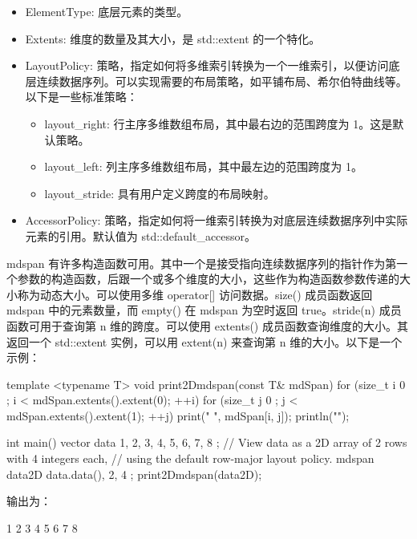 \begin{itemize}
\item
ElementType: 底层元素的类型。

\item
Extents: 维度的数量及其大小，是 std::extent 的一个特化。

\item
LayoutPolicy: 策略，指定如何将多维索引转换为一个一维索引，以便访问底层连续数据序列。可以实现需要的布局策略，如平铺布局、希尔伯特曲线等。以下是一些标准策略：
\begin{itemize}
\item
layout\_right: 行主序多维数组布局，其中最右边的范围跨度为 1。这是默认策略。

\item
layout\_left: 列主序多维数组布局，其中最左边的范围跨度为 1。

\item
layout\_stride: 具有用户定义跨度的布局映射。
\end{itemize}

\item
AccessorPolicy: 策略，指定如何将一维索引转换为对底层连续数据序列中实际元素的引用。默认值为 std::default\_accessor。
\end{itemize}

mdspan 有许多构造函数可用。其中一个是接受指向连续数据序列的指针作为第一个参数的构造函数，后跟一个或多个维度的大小，这些作为构造函数参数传递的大小称为动态大小。可以使用多维 operator[] 访问数据。size() 成员函数返回 mdspan 中的元素数量，而 empty() 在 mdspan 为空时返回 true。stride(n) 成员函数可用于查询第 n 维的跨度。可以使用 extents() 成员函数查询维度的大小。其返回一个 std::extent 实例，可以用 extent(n) 来查询第 n 维的大小。以下是一个示例：

\begin{cpp}
template <typename T> void print2Dmdspan(const T& mdSpan)
{
    for (size_t i { 0 }; i < mdSpan.extents().extent(0); ++i) {
        for (size_t j { 0 }; j < mdSpan.extents().extent(1); ++j) {
            print("{} ", mdSpan[i, j]);
        }
        println("");
    }
}

int main()
{
    vector data { 1, 2, 3, 4, 5, 6, 7, 8 };
    // View data as a 2D array of 2 rows with 4 integers each,
    // using the default row-major layout policy.
    mdspan data2D { data.data(), 2, 4 };
    print2Dmdspan(data2D);
}
\end{cpp}

输出为：

\begin{shell}
1 2 3 4
5 6 7 8
\end{shell}


